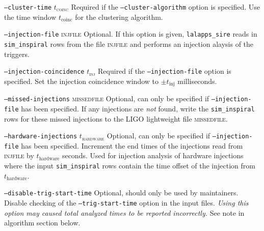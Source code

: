 \begin{entry}
\begin{entry}
\item[\texttt{--cluster-time} \textsc{$t_\mathrm{coinc}$}] Required if the 
\texttt{--cluster-algorithm} option is specified. Use the time window
$t_\mathrm{coinc}$ for the clustering algorithm.

\item[\texttt{--injection-file} \textsc{injfile}] Optional. If this option is
given, \verb$lalapps_sire$ reads in \verb$sim_inspiral$ rows from the file
\textsc{injfile} and performs an injection alaysis of the triggers.

\item[\texttt{--injection-coincidence} \textsc{$t_\mathrm{inj}$}] Required if
the \texttt{--injection-file} option is specified. Set the injection
coincidence window to $\pm t_\mathrm{inj}$ milliseconds.

\item[\texttt{--missed-injections} \textsc{missedfile}] Optional, can only be
specified if \texttt{--injection-file} has been specified. If any injections
are \emph{not} found, write the \verb$sim_inspiral$ rows for these missed
injections to the LIGO lightweight file \textsc{missedfile}.

\item[\texttt{--hardware-injections} \textsc{$t_\mathrm{hardware}$}] Optional,
can only be specified if \texttt{--injection-file} has been specified.
Increment the end times of the injections read from \textsc{injfile} by
$t_\mathrm{hardware}$ seconds. Used for injection analysis of hardware
injections where the input \verb$sim_inspiral$ rows contain the time offset of
the injection from  $t_\mathrm{hardware}$.

\item[\texttt{--disable-trig-start-time}] Optional, should only be used by
maintainers. Disable checking of the \texttt{--trig-start-time} option in the
input files. \emph{Using this option may caused total analyzed times to be
reported incorrectly.} See note in algorithm section below.
\end{entry}


\end{entry}
